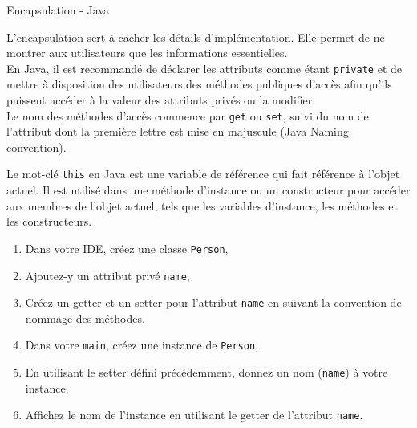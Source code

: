 \begin{Exercice}[10 minutes]{Encapsulation - Java}

L'encapsulation sert à cacher les détails d'implémentation. Elle permet de ne montrer aux utilisateurs que les informations essentielles. \\

En Java, il est recommandé de déclarer les attributs comme étant \lstinline{private} et de mettre à disposition des utilisateurs des méthodes publiques d'accès afin qu'ils puissent accéder à la valeur des attributs privés ou la modifier.\\

Le nom des méthodes d'accès commence par \lstinline{get} ou \lstinline{set}, suivi du nom de l'attribut dont la première lettre est mise en majuscule \href{https://www.oracle.com/java/technologies/javase/codeconventions-namingconventions.html}{(Java Naming convention)}. \newline 

Le mot-clé \lstinline{this} en Java est une variable de référence qui fait référence à l'objet actuel. Il est utilisé dans une méthode d'instance ou un constructeur pour accéder aux membres de l'objet actuel, tels que les variables d'instance, les méthodes et les constructeurs. \\

\begin{enumerate}
	\item Dans votre IDE, créez une classe \lstinline{Person},
	\item Ajoutez-y un attribut privé \lstinline{name},
	\item Créez un getter et un setter pour l'attribut \lstinline{name} en suivant la convention de nommage des méthodes.
	\item Dans votre \lstinline{main}, créez une instance de \lstinline{Person}, 
	\item En utilisant le setter défini précédemment, donnez un nom (\lstinline{name}) à votre instance.
	\item Affichez le nom de l'instance en utilisant le getter de l'attribut \lstinline{name}.
\end{enumerate}
	\begin{solution}  
		 
	\end{solution}
\end{Exercice}
	
